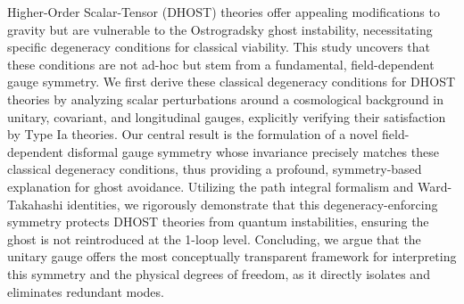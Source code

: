 \documentclass[twocolumn]{aastex631}
\begin{document}
Higher-Order Scalar-Tensor (DHOST) theories offer appealing modifications to gravity but are vulnerable to the Ostrogradsky ghost instability, necessitating specific degeneracy conditions for classical viability. This study uncovers that these conditions are not ad-hoc but stem from a fundamental, field-dependent gauge symmetry. We first derive these classical degeneracy conditions for DHOST theories by analyzing scalar perturbations around a cosmological background in unitary, covariant, and longitudinal gauges, explicitly verifying their satisfaction by Type Ia theories. Our central result is the formulation of a novel field-dependent disformal gauge symmetry whose invariance precisely matches these classical degeneracy conditions, thus providing a profound, symmetry-based explanation for ghost avoidance. Utilizing the path integral formalism and Ward-Takahashi identities, we rigorously demonstrate that this degeneracy-enforcing symmetry protects DHOST theories from quantum instabilities, ensuring the ghost is not reintroduced at the 1-loop level. Concluding, we argue that the unitary gauge offers the most conceptually transparent framework for interpreting this symmetry and the physical degrees of freedom, as it directly isolates and eliminates redundant modes.
\end{document}
